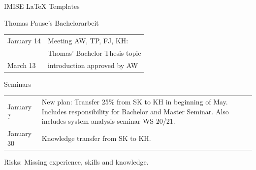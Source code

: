 \documentclass[]{kiesgrube}
\begin{document}
\begin{poster}
\begin{posterbox}[name=risks,column=1,row=0]{IMISE LaTeX Templates}
\end{posterbox}
\begin{posterbox}[name=thomasba,column=0,below=person]{Thomas Pause's Bachelorarbeit}
\begin{tabulary}{\textwidth}{lL}
January 14		&Meeting AW, TP, FJ, KH:\\
			&Thomas' Bachelor Thesis topic\\
March 13		&introduction approved by AW\\
\end{tabulary}
\end{posterbox}
\begin{posterbox}[name=scienceseminar,column=0,below=thomasba]{Seminars}
\begin{tabulary}{\textwidth}{lL}
January ? 			&New plan: Transfer 25\% from SK to KH in beginning of May. Includes responsibility for Bachelor and Master Seminar. Also includes system analysis seminar WS 20/21.\\
January 30			&Knowledge transfer from SK to KH.\\
\end{tabulary}
Risks: Missing experience, skills and knowledge.
\end{posterbox}




\end{poster}
\end{document}
